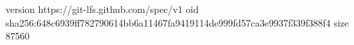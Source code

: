 version https://git-lfs.github.com/spec/v1
oid sha256:648c6939ff782790614bb6a11467fa9419114de999fd57ca3e9937f339f388f4
size 87560
